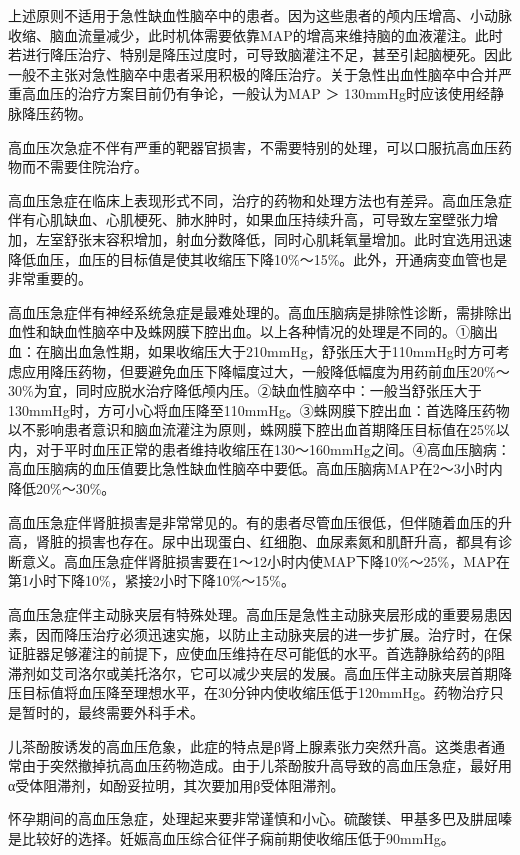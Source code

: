 上述原则不适用于急性缺血性脑卒中的患者。因为这些患者的颅内压增高、小动脉收缩、脑血流量减少，此时机体需要依靠MAP的增高来维持脑的血液灌注。此时若进行降压治疗、特别是降压过度时，可导致脑灌注不足，甚至引起脑梗死。因此一般不主张对急性脑卒中患者采用积极的降压治疗。关于急性出血性脑卒中合并严重高血压的治疗方案目前仍有争论，一般认为MAP
＞ 130mmHg时应该使用经静脉降压药物。

高血压次急症不伴有严重的靶器官损害，不需要特别的处理，可以口服抗高血压药物而不需要住院治疗。

高血压急症在临床上表现形式不同，治疗的药物和处理方法也有差异。高血压急症伴有心肌缺血、心肌梗死、肺水肿时，如果血压持续升高，可导致左室壁张力增加，左室舒张末容积增加，射血分数降低，同时心肌耗氧量增加。此时宜选用迅速降低血压，血压的目标值是使其收缩压下降10\%～15\%。此外，开通病变血管也是非常重要的。

高血压急症伴有神经系统急症是最难处理的。高血压脑病是排除性诊断，需排除出血性和缺血性脑卒中及蛛网膜下腔出血。以上各种情况的处理是不同的。①脑出血：在脑出血急性期，如果收缩压大于210mmHg，舒张压大于110mmHg时方可考虑应用降压药物，但要避免血压下降幅度过大，一般降低幅度为用药前血压20\%～30\%为宜，同时应脱水治疗降低颅内压。②缺血性脑卒中：一般当舒张压大于130mmHg时，方可小心将血压降至110mmHg。③蛛网膜下腔出血：首选降压药物以不影响患者意识和脑血流灌注为原则，蛛网膜下腔出血首期降压目标值在25\%以内，对于平时血压正常的患者维持收缩压在130～160mmHg之间。④高血压脑病：高血压脑病的血压值要比急性缺血性脑卒中要低。高血压脑病MAP在2～3小时内降低20\%～30\%。

高血压急症伴肾脏损害是非常常见的。有的患者尽管血压很低，但伴随着血压的升高，肾脏的损害也存在。尿中出现蛋白、红细胞、血尿素氮和肌酐升高，都具有诊断意义。高血压急症伴肾脏损害要在1～12小时内使MAP下降10\%～25\%，MAP在第1小时下降10\%，紧接2小时下降10\%～15\%。

高血压急症伴主动脉夹层有特殊处理。高血压是急性主动脉夹层形成的重要易患因素，因而降压治疗必须迅速实施，以防止主动脉夹层的进一步扩展。治疗时，在保证脏器足够灌注的前提下，应使血压维持在尽可能低的水平。首选静脉给药的β阻滞剂如艾司洛尔或美托洛尔，它可以减少夹层的发展。高血压伴主动脉夹层首期降压目标值将血压降至理想水平，在30分钟内使收缩压低于120mmHg。药物治疗只是暂时的，最终需要外科手术。

儿茶酚胺诱发的高血压危象，此症的特点是β肾上腺素张力突然升高。这类患者通常由于突然撤掉抗高血压药物造成。由于儿茶酚胺升高导致的高血压急症，最好用α受体阻滞剂，如酚妥拉明，其次要加用β受体阻滞剂。

怀孕期间的高血压急症，处理起来要非常谨慎和小心。硫酸镁、甲基多巴及肼屈嗪是比较好的选择。妊娠高血压综合征伴子痫前期使收缩压低于90mmHg。

